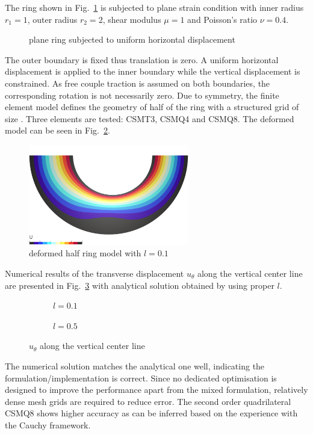 \documentclass[3p,sort&compress,11pt,fleqn,review]{elsarticle}
\newcommand*{\figref}[1]{Fig.~\ref{#1}}
\begin{document}
The ring shown in \figref{fig:ring} is subjected to plane strain condition with inner radius $r_1=1$, outer radius $r_2=2$, shear modulus $\mu=1$ and Poisson's ratio $\nu=0.4$.
\begin{figure}[htb]
\centering\footnotesize
{}
\caption{plane ring subjected to uniform horizontal displacement}\label{fig:ring}
\end{figure}
The outer boundary is fixed thus translation is zero. A uniform horizontal displacement is applied to the inner boundary while the vertical displacement is constrained. As free couple traction is assumed on both boundaries, the corresponding rotation is not necessarily zero. Due to symmetry, the finite element model defines the geometry of half of the ring with a structured grid of size . Three elements are tested: CSMT3, CSMQ4 and CSMQ8. The deformed model can be seen in \figref{fig:deformed_ring}.
\begin{figure}[htb]
\centering\footnotesize
\includegraphics[width=7cm]{MODEL/RING/MODEL}
\caption{deformed half ring model with $l=\num{0.1}$}\label{fig:deformed_ring}
\end{figure}

Numerical results of the transverse displacement $u_\theta$ along the vertical center line are presented in \figref{fig:u_theta} with analytical solution obtained by using proper $l$.
\begin{figure}[htb]
\centering\footnotesize
\begin{subfigure}[b]{.49\textwidth}\centering

\caption{$l=\num{0.1}$}
\end{subfigure}\hfill
\begin{subfigure}[b]{.49\textwidth}\centering

\caption{$l=\num{0.5}$}
\end{subfigure}
\caption{$u_\theta$ along the vertical center line}\label{fig:u_theta}
\end{figure}
The numerical solution matches the analytical one well, indicating the formulation/implementation is correct. Since no dedicated optimisation is designed to improve the performance apart from the mixed formulation, relatively dense mesh grids are required to reduce error. The second order quadrilateral CSMQ8 shows higher accuracy as can be inferred based on the experience with the Cauchy framework.
\end{document}
